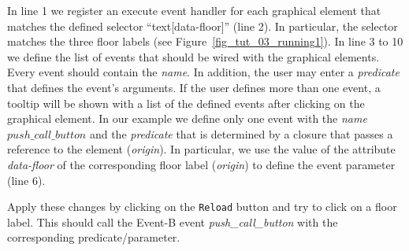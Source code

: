 In line 1 we register an execute event handler for each graphical element that matches the defined selector ``text[data-floor]'' (line 2).
In particular, the selector matches the three floor labels (see Figure~\ref{fig_tut_03_running1}).
In line 3 to 10 we define the list of events that should be wired with the graphical elements.
Every event should contain the \textit{name}.
In addition, the user may enter a \textit{predicate} that defines the event's arguments.
If the user defines more than one event, a tooltip will be shown with a list of the defined events after clicking on the graphical element.
In our example we define only one event with the \textit{name} $push\_call\_button$ and the \textit{predicate} that is determined by a closure that passes a reference to the element (\textit{origin}).
In particular, we use the value of the attribute \textit{data-floor} of the corresponding floor label (\textit{origin}) to define the event parameter (line 6).

Apply these changes by clicking on the \texttt{Reload} button and try to click on a floor label.
This should call the Event-B event \textit{push\_call\_button} with the corresponding predicate/parameter.

